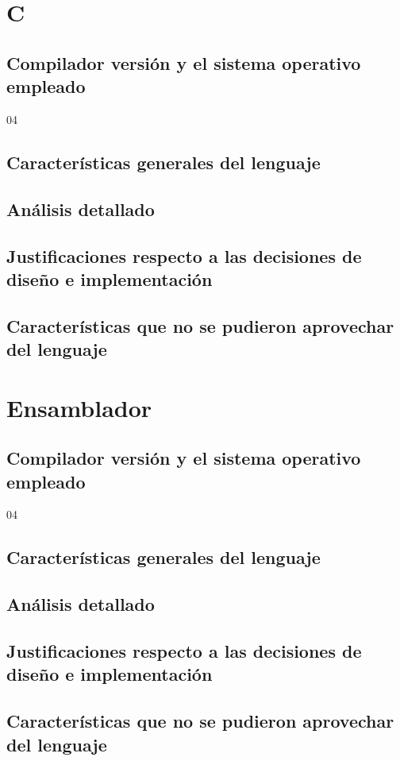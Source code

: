 \documentclass[]{scrartcl}
\begin{document}
      \section{C}
       \subsection{Compilador versi\'on y el sistema operativo empleado}04
        \subsection{Caracter\'isticas generales del lenguaje}
        \subsection{An\'alisis detallado}
        \subsection{Justificaciones respecto a las decisiones de diseño e implementaci\'on}
        \subsection{Caracter\'isticas que no se pudieron aprovechar del lenguaje}
          \section{Ensamblador}
           \subsection{Compilador versi\'on y el sistema operativo empleado}04
            \subsection{Caracter\'isticas generales del lenguaje}
            \subsection{An\'alisis detallado}
            \subsection{Justificaciones respecto a las decisiones de diseño e implementaci\'on}
            \subsection{Caracter\'isticas que no se pudieron aprovechar del lenguaje}
\end{document}
